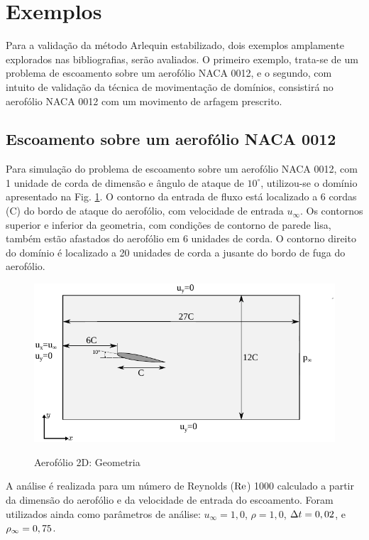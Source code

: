 \documentclass[tese_patricia]{subfiles}
\begin{document}
\section{Exemplos}

Para a validação da método Arlequin estabilizado, dois exemplos amplamente explorados nas bibliografias, serão avaliados. O primeiro exemplo, trata-se de um problema de escoamento sobre um aerofólio NACA 0012, e o segundo, com intuito de validação da técnica de movimentação de domínios, consistirá no aerofólio NACA 0012 com um movimento de arfagem prescrito. 

\subsection{Escoamento sobre um aerofólio NACA 0012} \label{subsec:EX1NACA0012}

Para simulação do problema de escoamento sobre um aerofólio NACA 0012, com 1 unidade de corda de dimensão e ângulo de ataque de $10^{\circ}$, utilizou-se o domínio apresentado na Fig. \ref{fig:aerofolio2d_geometria}. O contorno da entrada de fluxo está localizado a 6 cordas (C) do bordo de ataque do aerofólio, com velocidade de entrada $u_\infty$. Os contornos superior e inferior da geometria, com condições de contorno de parede lisa, também estão afastados do aerofólio em 6 unidades de corda. O contorno direito do domínio é localizado a 20 unidades de corda a jusante do bordo de fuga do aerofólio. 

\begin{figure}[htb!]
	\centering 
	{\includegraphics[scale=1.0,trim=0cm 0cm 0cm 0cm, clip=true]{Imagens/Cap6/aerofolio.pdf}}	
	\caption{Aerofólio 2D: Geometria}
	\label{fig:aerofolio2d_geometria}
\end{figure}

A análise é realizada para um número de Reynolds ($\mathrm{Re}$) 1000 calculado a partir da dimensão do aerofólio e da velocidade de entrada do escoamento. Foram utilizados ainda como parâmetros de análise: $u_{\infty} = 1,0$,  $\rho = 1,0$,  $\Delta t = 0,02$, e $\rho_\infty = 0,75$.
\end{document}
